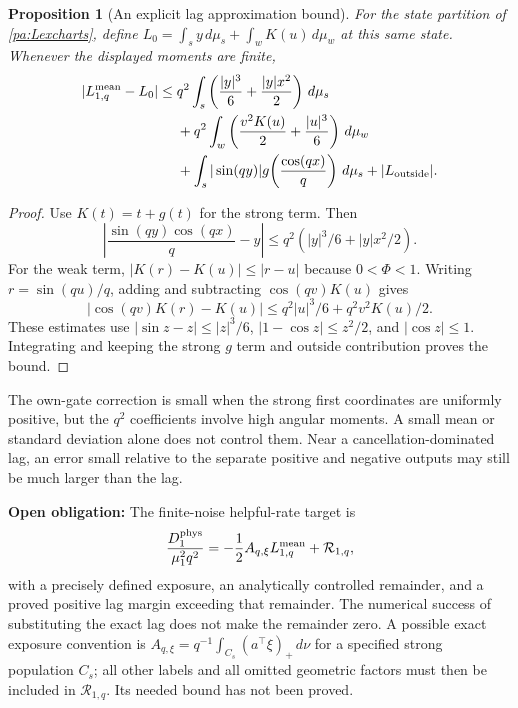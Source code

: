 \documentclass[11pt]{article}
\numberwithin{equation}{section}
\newtheorem{proposition}{Proposition}[section]
\theoremstyle{definition}
\theoremstyle{remark}
\newcommand{\1}{\mathbf 1}
\newcommand{\dd}{\,d}
\newcommand{\openobligation}[1]{\par\noindent\textbf{Open obligation:} #1\par\smallskip}
\begin{document}
\begin{proposition}[An explicit lag approximation bound]\label{pa:lagerror}
For the state partition of \eqref{pa:Lexcharts}, define
$L_0=\int_s y\dd\mu_s+\int_wK(u)\dd\mu_w$ at this same state.
Whenever the displayed moments are finite,
\begin{align}\label{pa:lagerror-eq}
 |L_{1,q}^{\rm mean}-L_0|\le{}&
 q^2\int_s\left(\frac{|y|^3}{6}+\frac{|y|x^2}{2}\right)\dd\mu_s\nonumber\\
 &+q^2\int_w\left(\frac{v^2K(u)}2+\frac{|u|^3}{6}\right)\dd\mu_w\nonumber\\
 &+\int_s|\sin(qy)|g\!\left(\frac{\cos(qx)}q\right)\dd\mu_s
 +|L_{\rm outside}|.
\end{align}
\end{proposition}
\begin{proof}
Use $K(t)=t+g(t)$ for the strong term. Then
\[
 \left|\frac{\sin(qy)\cos(qx)}q-y\right|
 \le q^2\left(|y|^3/6+|y|x^2/2\right).
\]
For the weak term, $|K(r)-K(u)|\le|r-u|$ because $0<\Phi<1$.
Writing $r=\sin(qu)/q$, adding and subtracting $\cos(qv)K(u)$ gives
\[
 |\cos(qv)K(r)-K(u)|
 \le q^2|u|^3/6+q^2v^2K(u)/2.
\]
These estimates use $|\sin z-z|\le|z|^3/6$,
$|1-\cos z|\le z^2/2$, and $|\cos z|\le1$. Integrating and keeping
the strong $g$ term and outside contribution proves the bound.
\end{proof}
The own-gate correction is small when the strong first coordinates are
uniformly positive, but the $q^2$ coefficients involve high angular
moments. A small mean or standard deviation alone does not control them.
Near a cancellation-dominated lag, an error small relative to the separate
positive and negative outputs may still be much larger than the lag.

\openobligation{The finite-noise helpful-rate target is
\[
 \frac{D_1^{\rm phys}}{\mu_1^2q^2}
 =-\frac12A_{q,\xi}L_{1,q}^{\rm mean}+\mathcal R_{1,q},
\]
with a precisely defined exposure, an analytically controlled remainder,
and a proved positive lag margin exceeding that remainder. The numerical
success of substituting the exact lag does not make the remainder zero.
A possible exact exposure convention is
$A_{q,\xi}=q^{-1}\int_{C_s}(a^\top\xi)_+\dd\nu$ for a specified strong
population $C_s$; all other labels and all omitted geometric factors must
then be included in $\mathcal R_{1,q}$. Its needed bound has not been proved.}
\end{document}
